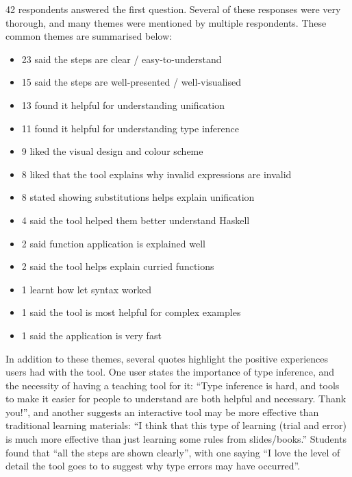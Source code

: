 \documentclass[a4paper,fleqn,oneside,12pt]{report}
\begin{document}
42 respondents answered the first question. Several of these responses were very thorough, and many themes were mentioned by multiple respondents. These common themes are summarised below:
\begin{itemize}
  \item 23 said the steps are clear / easy-to-understand
  \item 15 said the steps are well-presented / well-visualised
  \item 13 found it helpful for understanding unification
  \item 11 found it helpful for understanding type inference
  \item 9 liked the visual design and colour scheme
  \item 8 liked that the tool explains why invalid expressions are invalid
  \item 8 stated showing substitutions helps explain unification
  \item 4 said the tool helped them better understand Haskell
  \item 2 said function application is explained well
  \item 2 said the tool helps explain curried functions
  \item 1 learnt how let syntax worked
  \item 1 said the tool is most helpful for complex examples
  \item 1 said the application is very fast
\end{itemize}

In addition to these themes, several quotes highlight the positive experiences users had with the tool. One user states the importance of type inference, and the necessity of having a teaching tool for it: “Type inference is hard, and tools to make it easier for people to understand are both helpful and necessary. Thank you!”, and another suggests an interactive tool may be more effective than traditional learning materials: “I think that this type of learning (trial and error) is much more effective than just learning some rules from slides/books.” Students found that “all the steps are shown clearly”, with one saying “I love the level of detail the tool goes to to suggest why type errors may have occurred”.
\end{document}
